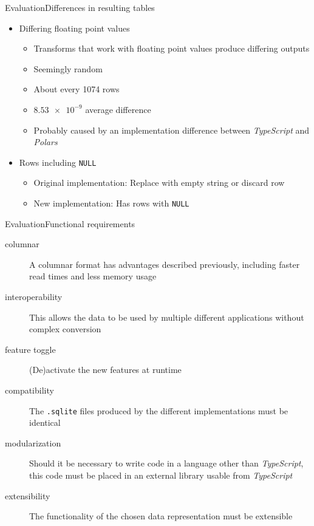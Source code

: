 \begin{frame}[t]{Evaluation}{Differences in resulting tables}
	\begin{itemize}
		\item Differing floating point values
		      \begin{itemize}
			      \item Transforms that work with floating point values produce differing outputs
			      \item Seemingly random
			      \item About every 1074 rows
			      \item $\num{8.53e-9}$ average difference
			      \item Probably caused by an implementation difference between \emph{TypeScript} and \emph{Polars}
		      \end{itemize}
		\item Rows including \Verb|NULL|
		      \begin{itemize}
			      \item Original implementation: Replace with empty string or discard row
			      \item New implementation: Has rows with \Verb|NULL|
		      \end{itemize}
	\end{itemize}

\end{frame}

\begin{frame}[t]{Evaluation}{Functional requirements}
	\begin{description}
		\item[columnar] A columnar format has advantages described previously, including faster read times and less memory usage \uncover<2->{({\color{green} \checkmark})}
		\item[interoperability] This allows the data to be used by multiple different applications without complex conversion \uncover<3->{({\color{green} \checkmark})}
		\item[feature toggle] (De)activate the new features at runtime \uncover<4->{({\color{green} \checkmark})}
		\item[compatibility] The \Verb|.sqlite| files produced by the different implementations must be identical \uncover<5->{({\color{red} \xmark})}
		\item[modularization] Should it be necessary to write code in a language other than \emph{TypeScript}, this code must be placed in an external library usable from \emph{TypeScript} \uncover<6->{({\color{green} \checkmark})}
		\item[extensibility] The functionality of the chosen data representation must be extensible \uncover<7->{({\color{green} \checkmark})}
	\end{description}
\end{frame}

